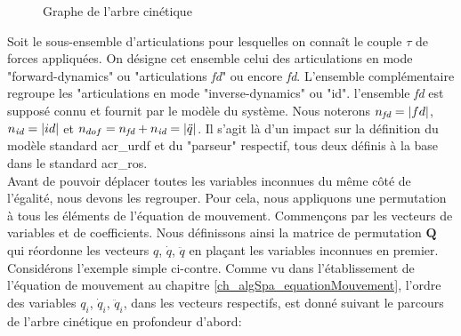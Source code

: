 \documentclass{report}
\begin{document}

\begin{figure}
  \begin{center}
    \caption{Graphe de l'arbre cinétique}
    \label{fig_chdaArbreK1}
  \end{center}
\end{figure}

Soit le sous-ensemble d'articulations pour lesquelles on connaît le couple $\tau$ de forces appliquées. On désigne cet ensemble celui des articulations en mode "forward-dynamics" ou "articulations \emph{fd}" ou encore \emph{fd}. L'ensemble complémentaire regroupe les "articulations en mode "inverse-dynamics" ou "id". l'ensemble \emph{fd} est supposé connu et fournit par le modèle du système. Nous noterons $n_{\emph{fd}}=\vert fd \vert$, $n_{\emph{id}}=\vert id \vert$ et $n_{dof}=n_{\emph{fd}}+n_{\emph{id}}=\vert \ddot{q} \vert$. Il s'agit là d'un impact sur la définition du modèle standard \gls{acr_urdf} et du "parseur" respectif, tous deux définis à la base dans le standard \gls{acr_ros}.\\
Avant de pouvoir déplacer toutes les variables inconnues du même côté de l'égalité, nous devons les regrouper. Pour cela, nous appliquons une permutation à tous les éléments de l'équation de mouvement. Commençons par les vecteurs de variables et de coefficients. Nous définissons ainsi la matrice de permutation $\mathbf{Q}$ qui réordonne les vecteurs $q$, $\dot{q}$, $\ddot{q}$ en plaçant les variables inconnues en premier. Considérons l'exemple simple ci-contre. Comme vu dans l'établissement de l'équation de mouvement au chapitre \ref{ch_algSpa_equationMouvement}, l'ordre des variables $q_i$, $\dot{q}_i$, $\ddot{q}_i$, dans les vecteurs respectifs, est donné suivant le parcours de l'arbre cinétique en profondeur d'abord:
\end{document}
